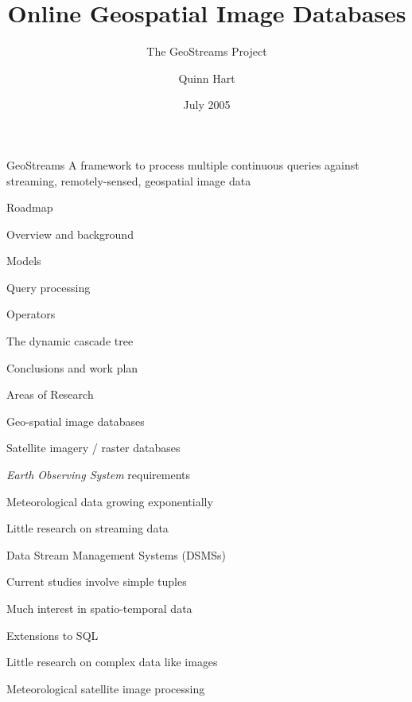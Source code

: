 \documentclass[final,total,bgColor,slideColor,pdf,ps2pdf,default,noaccumulate]{prosper}
\title{Online Geospatial Image Databases}
\subtitle{The GeoStreams Project}
\author{Quinn Hart}
\date{July 2005}
\begin{document}
\maketitle

\begin{slide}[R]{GeoStreams} 
  \centering
  \vspace*{1.5cm}  
  \large{A framework to process multiple}
  \large{continuous queries against}
  \large{streaming, remotely-sensed,}
  \large{geospatial image data}

\end{slide}

\begin{slide}{Roadmap}
  \begin{Itemize}
  {\blue \item Overview and background}
  \item Models
  \item Query processing
  \item Operators
  \item The dynamic cascade tree
  \item Conclusions and work plan
  \end{Itemize}
\end{slide}

\begin{slide}{Areas of Research}
  \begin{Itemize}
  \item Geo-spatial image databases
    \begin{Itemize}
    \item Satellite imagery / raster databases
    \item \emph{Earth Observing System} requirements
    \item Meteorological data growing exponentially
    {\blue \item Little research on streaming data }
    \end{Itemize}
  \item Data Stream Management Systems (DSMSs)
    \begin{Itemize}
    \item Current studies involve simple tuples
    \item Much interest in spatio-temporal data
    \item Extensions to SQL
    {\blue \item Little research on complex data like images}
    \end{Itemize}
  \item Meteorological satellite image processing
  \end{Itemize}
\end{slide}
\end{document}
